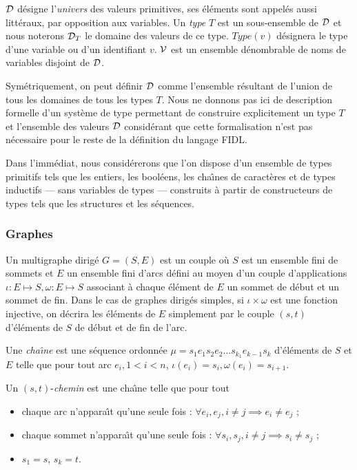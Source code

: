 ${\cal D}$ d\'esigne l'\emph{univers} des valeurs primitives, ses
\'el\'ements sont appel\'es aussi litt\'eraux, par opposition aux
variables. Un \emph{type}  $T$ est un sous-ensemble de
${\cal D}$ et nous noterons ${\cal D}_T$ le domaine des valeurs de ce
type. $Type(v)$ d\'esignera le type d'une variable ou d'un
identifiant $v$. ${\cal V}$ est un ensemble d\'enombrable de noms de
variables disjoint de ${\cal D}$.

Sym\'etriquement, on peut d\'efinir $\cal D$ comme l'ensemble r\'esultant de l'union de tous les domaines de
tous les types $T$. Nous ne donnons pas ici de description formelle
d'un syst\`eme de type permettant de construire explicitement un type
$T$ et l'ensemble des valeurs $\cal D$ consid\'erant que cette
formalisation n'est pas n\'ecessaire pour le reste de la
d\'efinition du langage \textsf{FIDL}. 

Dans l'imm\'ediat, nous consid\'ererons que l'on dispose d'un
ensemble de types primitifs tels que les entiers, les bool\'eens, les
cha\^{\i}nes de caract\`eres et de types inductifs --- sans variables
de types --- construits \`a partir de constructeurs de types tels que les
structures et les s\'equences.

\subsubsection{Graphes}

Un multigraphe dirig\'e $G=(S,E)$ est un couple o\`u $S$ est un ensemble fini de sommets et
$E$ un ensemble fini d'arcs d\'efini au moyen d'un couple
d'applications $\iota:E\mapsto S,\omega:E\mapsto S$ associant \`a
chaque \'el\'ement de $E$ un sommet de d\'ebut et un sommet  de
fin. Dans le cas de graphes dirig\'es simples, si $\iota \times{}
\omega$ est une fonction injective, on d\'ecrira les
\'el\'ements de $E$ simplement par le couple $(s,t)$
d'\'el\'ements de $S$ de d\'ebut et de fin de l'arc. 

Une \emph{cha\^{\i}ne} est une s\'equence ordonn\'ee $\mu{}= s_1e_1s_2e_2 \dots s_{k_1}e_{k-1}s_k$
d'\'el\'ements de $S$ et $E$ telle que  pour tout arc $e_i, 1<i<n$,
$\iota(e_i) = s_i, \omega(e_i) = s_{i+1}$.

Un $(s,t)$-\emph{chemin} est une cha\^{\i}ne telle que pour tout
\begin{itemize}
  \item chaque arc n'appara\^{\i}t qu'une seule fois : $\forall e_i,e_j,
    i\neq j \implies e_i\neq e_j$ ;
  \item chaque sommet n'appara\^{\i}t qu'une seule fois : $\forall
  s_i,s_j, i\neq j \implies s_i\neq s_j$ ;
  \item $s_1 = s$,  $s_k=t$.
\end{itemize}

